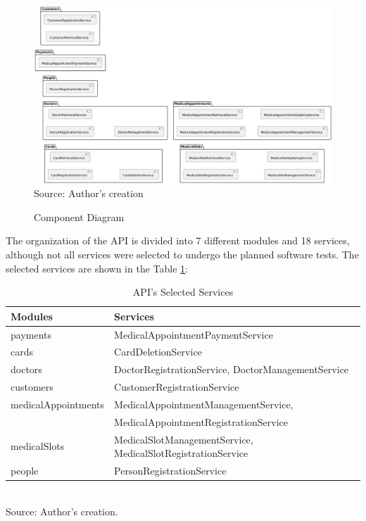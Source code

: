 \begin{landscape}
\begin{figure}[H]
    \centering
    \caption{Component Diagram}
    \includegraphics[width=0.99\linewidth]{figures/component_diagram.png}
    \label{fig:component_diagram}
    \\ \footnotesize Source: Author's creation
\end{figure}
\end{landscape}

The organization of the API is divided into 7 different modules and 18 services, although not all services were selected to undergo the planned software tests. The selected services are shown in the Table \ref{tab:selected_services}:

\begin{table}[H]
\centering
\centering
\caption{API's Selected Services}
\begin{tabular}{ll}
\label{tab:selected_services}
\textbf{Modules} & \textbf{Services} \\ \hline
payments & MedicalAppointmentPaymentService \\ \hline
cards & CardDeletionService\\ \hline
doctors & DoctorRegistrationService, DoctorManagementService \\ \hline
customers & CustomerRegistrationService \\ \hline
medicalAppointments & MedicalAppointmentManagementService, \\
 & MedicalAppointmentRegistrationService \\ \hline
medicalSlots & MedicalSlotManagementService, MedicalSlotRegistrationService \\ \hline
people & PersonRegistrationService \\ \hline
\end{tabular}
\\ \footnotesize Source: Author's creation.
\end{table}

